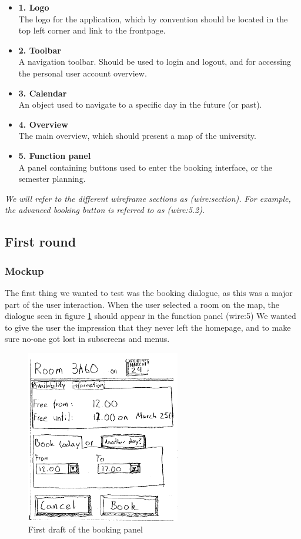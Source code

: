 \begin{itemize}
	\item \textbf{1. Logo}\\
	The logo for the application, which by convention should be located in the top left corner and link to the frontpage. \cite{steve}
	\item \textbf{2. Toolbar}\\
	A navigation toolbar. Should be used to login and logout, and for accessing the personal user account overview.
	\item \textbf{3. Calendar}\\
	An object used to navigate to a specific day in the future (or past).
	\item \textbf{4. Overview}\\
	The main overview, which should present a map of the university.
	\item \textbf{5. Function panel}\\
	A panel containing buttons used to enter the booking interface, or the semester planning.
\end{itemize}

\emph{We will refer to the different wireframe sections as (wire:section). For example, the advanced booking button is referred to as (wire:5.2).} 

\subsection{First round}
\subsubsection{Mockup}
\label{sub:first_mockup}
The first thing we wanted to test was the booking dialogue, as this was a major part of the user interaction. When the user selected a room on the map, the dialogue seen in figure \ref{fig:book_room_mockup} should appear in the function panel (wire:5)
 We wanted to give the user the impression that they never left the homepage, and to make sure no-one got lost in subscreens and menus.
\begin{figure}[htb]
\begin{center}
\leavevmode
\includegraphics[width=0.6\textwidth]{images/bookRoomMockup}
\end{center}
\caption{First draft of the booking panel}
\label{fig:book_room_mockup}
\end{figure}

